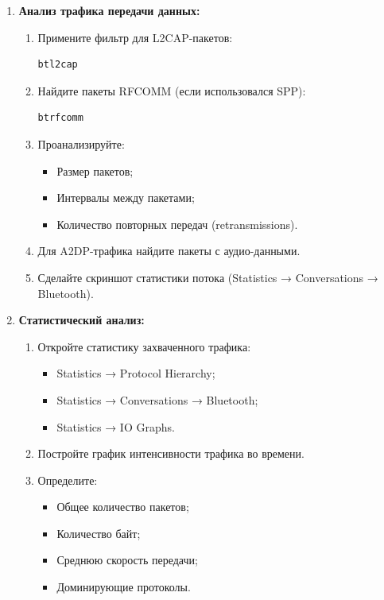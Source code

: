 \begin{enumerate}[nosep, leftmargin=*]
    \item \textbf{Анализ трафика передачи данных:}
    \begin{enumerate}[label=\alph*), nosep]
        \item Примените фильтр для L2CAP-пакетов:
        \begin{lstlisting}
btl2cap
        \end{lstlisting}
        \item Найдите пакеты RFCOMM (если использовался SPP):
        \begin{lstlisting}
btrfcomm
        \end{lstlisting}
        \item Проанализируйте:
        \begin{itemize}[nosep]
            \item Размер пакетов;
            \item Интервалы между пакетами;
            \item Количество повторных передач (retransmissions).
        \end{itemize}
        \item Для A2DP-трафика найдите пакеты с аудио-данными.
        \item Сделайте скриншот статистики потока (Statistics → Conversations → Bluetooth).
    \end{enumerate}

    \item \textbf{Статистический анализ:}
    \begin{enumerate}[label=\alph*), nosep]
        \item Откройте статистику захваченного трафика:
        \begin{itemize}[nosep]
            \item Statistics → Protocol Hierarchy;
            \item Statistics → Conversations → Bluetooth;
            \item Statistics → IO Graphs.
        \end{itemize}
        \item Постройте график интенсивности трафика во времени.
        \item Определите:
        \begin{itemize}[nosep]
            \item Общее количество пакетов;
            \item Количество байт;
            \item Среднюю скорость передачи;
            \item Доминирующие протоколы.
        \end{itemize}
    \end{enumerate}
\end{enumerate}

